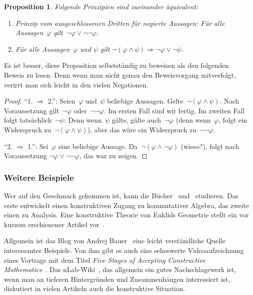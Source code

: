 \documentclass[a4paper,ngerman,12pt]{scrartcl}
\theoremstyle{definition}
\theoremstyle{plain}
\newtheorem{prop}[defn]{Proposition}
\theoremstyle{remark}
\renewcommand{\_}{\mathpunct{.}\,}
\newcommand{\?}{\,{:}\,}
\begin{document}
\begin{prop}Folgende Prinzipien sind zueinander äquivalent:
\begin{enumerate}
\item[1.] Prinzip vom ausgeschlossenen Dritten für negierte Aussagen: Für alle Aussagen~$\varphi$
gilt~$\neg\varphi \vee \neg\neg\varphi$.
\item[2.] Für alle Aussagen~$\varphi$ und $\psi$ gilt $\neg(\varphi \wedge \psi)
\Longrightarrow \neg\varphi \vee \neg\psi$.
\end{enumerate}
\end{prop}
Es ist besser, diese Proposition selbstständig zu beweisen als den folgenden
Beweis zu lesen. Denn wenn man nicht genau den Beweisvorgang mitverfolgt,
verirrt man sich leicht in den vielen Negationen.
\begin{proof}"`1. $\Rightarrow$ 2."': Seien~$\varphi$ und~$\psi$ beliebige
Aussagen. Gelte~$\neg(\varphi \wedge \psi)$. Nach
Voraussetzung gilt~$\neg\varphi$ oder~$\neg\neg\varphi$. Im ersten Fall sind
wir fertig. Im zweiten Fall folgt tatsächlich~$\neg\psi$: Denn
wenn~$\psi$ gälte, gälte auch~$\neg\varphi$ (denn wenn~$\varphi$, folgt ein
Widerspruch zu~$\neg(\varphi \wedge \psi)$), aber das wäre ein Widerspruch
zu~$\neg\neg\varphi$.

"`2. $\Rightarrow$ 1."': Sei~$\varphi$ eine beliebige Aussage. Da~$\neg(\varphi
\wedge \neg\varphi)$ (wieso?), folgt nach Voraussetzung $\neg\varphi \vee
\neg\neg\varphi$, das war zu zeigen.
\end{proof}


\subsubsection*{Weitere Beispiele}

Wer auf den Geschmack gekommen ist, kann die
Bücher~\cite{mines:richman:ruitenburg} und~\cite{bishop:bridges:bible}
studieren. Das erste entwickelt einen konstruktiven Zugang zu kommutativer Algebra, das
zweite einen zu Analysis. Eine konstruktive Theorie von Euklids Geometrie
stellt ein vor kurzem erschienener Artikel vor~\cite{beeson:tarski}.

Allgemein ist das Blog von Andrej
Bauer~\cite{bauer:blog} eine leicht verständliche Quelle interessanter Beispiele. Von ihm gibt es
auch eine seheswerte Videoaufzeichnung eines Vortrags mit dem Titel \emph{Five
Stages of Accepting Constructive Mathematics}~\cite{bauer:video}. Das
nLab-Wiki~\cite{nlab}, das allgemein ein gutes Nachschlagewerk ist, wenn man an
tieferen Hintergründen und Zusammenhängen interessiert ist, diskutiert in vielen Artikeln auch die
konstruktive Situation.
\end{document}
